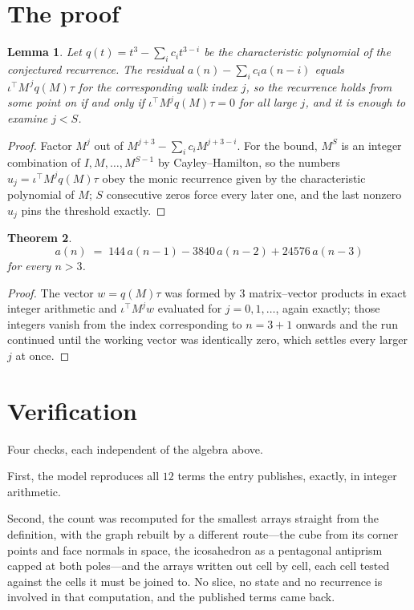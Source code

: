 \documentclass[11pt,a4paper]{article}
\theoremstyle{plain}
\newtheorem{theorem}{Theorem}
\newtheorem{lemma}[theorem]{Lemma}
\theoremstyle{definition}
\begin{document}
\section{The proof}

\begin{lemma}\label{lem:crit}
Let $q(t)=t^{3}-\sum_i c_it^{3-i}$ be the characteristic polynomial of the
conjectured recurrence. The residual $a(n)-\sum_ic_ia(n-i)$ equals
$\iota^{\!\top}M^{\,j}q(M)\tau$ for the corresponding walk index $j$, so the recurrence
holds from some point on if and only if $\iota^{\!\top}M^{j}q(M)\tau=0$ for all large $j$,
and it is enough to examine $j<S$.
\end{lemma}

\begin{proof}
Factor $M^{j}$ out of $M^{j+3}-\sum_ic_iM^{j+3-i}$. For the bound, $M^{S}$
is an integer combination of $I,M,\dots,M^{S-1}$ by Cayley--Hamilton, so the numbers
$u_j=\iota^{\!\top}M^{j}q(M)\tau$ obey the monic recurrence given by the characteristic
polynomial of $M$; $S$ consecutive zeros force every later one, and the last nonzero $u_j$
pins the threshold exactly.
\end{proof}

\begin{theorem}
\[
a(n)\;=\;144\,a(n-1) - 3840\,a(n-2) + 24576\,a(n-3)
\]
for every $n>3$.
\end{theorem}

\begin{proof}
The vector $w=q(M)\tau$ was formed by $3$ matrix--vector products in exact integer
arithmetic and $\iota^{\!\top}M^{j}w$ evaluated for $j=0,1,\dots$, again exactly; those
integers vanish from the index corresponding to $n=3+1$ onwards and the run continued
until the working vector was identically zero, which settles every larger $j$ at once.
\end{proof}

\section{Verification}

Four checks, each independent of the algebra above.

First, the model reproduces all $12$ terms the entry publishes, exactly, in integer
arithmetic.

Second, the count was recomputed for the smallest arrays straight from the definition, with the
graph rebuilt by a different route---the cube from its corner points and face normals in space,
the icosahedron as a pentagonal antiprism capped at both poles---and the arrays written out cell
by cell, each cell tested against the cells it must be joined to. No slice, no state and no
recurrence is involved in that computation, and the published terms came back.
\end{document}
